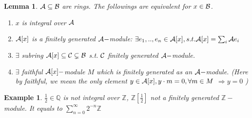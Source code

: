\documentclass[11pt]{article}
\newtheorem{lemma}[thm]{Lemma}
\newtheorem{ex}[thm]{Example}
\newcommand{\intg}{\mathbb Z}
\newcommand{\ratl}{\mathbb Q}
\newcommand{\cala}{{\cal A}}
\newcommand{\calb}{{\cal B}}
\newcommand{\calc}{{\cal C}}
\newcommand{\Lrta}{\Longrightarrow}
\begin{document}
\begin{lemma}
$\cala\subseteq \calb$ are rings. The followings are equivalent for $x\in\calb$.
\begin{enumerate}[label=(\roman*)]
\item $x$ is integral over $\cala$
\item $\cala[x]$ is a finitely generated $\cala-$module: $\exists e_1,..,e_n\in\cala[x],s.t. \cala[x]=\sum_i\cala e_i$
\item $\exists $ subring $\cala[x]\subseteq \calc\subsetneq \calb$ s.t. $\calc$ finitely generated $\cala-$module.
\item $\exists$ faithful $\cala[x]-$module $M$ which is finitely generated as an $\cala-$module.
(Here by faithful, we mean the only element $y\in\cala[x], y\cdot m=0,\forall m\in M$ $\Lrta y=0$ )
\end{enumerate}
\end{lemma}
\begin{ex}
$\frac{1}{2}\in\ratl$ is not integral over $\intg$, $\intg[\frac{1}{2}]$ not a finitely generated $\intg-$module. It equals to  $\sum_{n=0}^\infty 2^{-n}\intg$
\end{ex}
\end{document}
